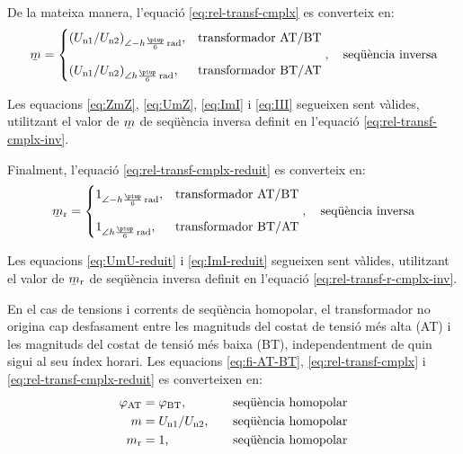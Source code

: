 De la mateixa manera, l'equació \eqref{eq:rel-transf-cmplx} es converteix en:
\begin{equation}\label{eq:rel-transf-cmplx-inv}
\cmplx{m} = \begin{cases}
     (U\ped{n1}/U\ped{n2})_{\angle -h \frac{\piup}{6}\unit{\,rad}}, & \text{transformador AT/BT}\\[2.7ex]
     (U\ped{n1}/U\ped{n2})_{\angle h \frac{\piup}{6}\unit{\,rad}}, & \text{transformador BT/AT}
\end{cases},
\quad\text{seqüència inversa}
\end{equation}

Les equacions \eqref{eq:ZmZ}, \eqref{eq:UmZ}, \eqref{eq:ImI} i \eqref{eq:III} segueixen sent vàlides, utilitzant el valor de $\cmplx{m}$ de seqüència inversa definit en l'equació \eqref{eq:rel-transf-cmplx-inv}.

Finalment, l'equació \eqref{eq:rel-transf-cmplx-reduit} es converteix en:
\begin{equation}\label{eq:rel-transf-r-cmplx-inv}
\cmplx{m}\ped{r}  = \begin{cases}
      1_{\angle -h\frac{\piup}{6}\unit{\,rad}}, & \text{transformador AT/BT}\\[2.7ex]
      1_{\angle h\frac{\piup}{6}\unit{\,rad}}, & \text{transformador BT/AT}
\end{cases},
\quad\text{seqüència inversa}
\end{equation}

Les equacions \eqref{eq:UmU-reduit} i \eqref{eq:ImI-reduit} segueixen sent vàlides, utilitzant el valor de $\cmplx{m}\ped{r}$ de seqüència inversa definit en l'equació \eqref{eq:rel-transf-r-cmplx-inv}.

En el cas de tensions i corrents de seqüència homopolar, el transformador no  origina cap desfasament entre les magnituds  del costat de tensió més alta (AT) i les magnituds del costat de tensió més baixa (BT), independentment de quin sigui al seu índex horari. Les equacions \eqref{eq:fi-AT-BT}, \eqref{eq:rel-transf-cmplx} i \eqref{eq:rel-transf-cmplx-reduit} es converteixen en:
\begin{alignat}{3}
  \varphi_\mathrm{AT} &= \varphi_\mathrm{BT}, &&\quad\text{seqüència homopolar} \\
  m &= U_\mathrm{n1}/U_\mathrm{n2}, &&\quad\text{seqüència homopolar}\label{eq:rel-transf-cmplx-hom} \\
  m_\mathrm{r} &= 1, &&\quad\text{seqüència homopolar}
\end{alignat}

